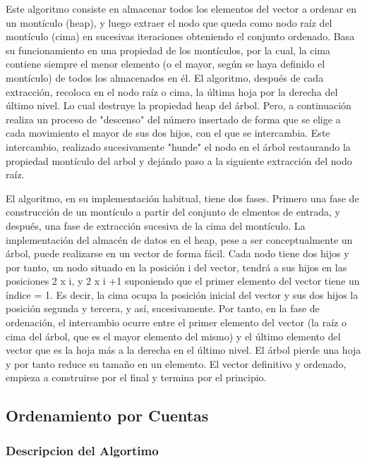 Este algoritmo consiste en almacenar todos los elementos del vector a ordenar en un montículo (heap), y luego extraer el nodo que queda como nodo raíz del montículo (cima) en sucesivas iteraciones obteniendo el conjunto ordenado. Basa su funcionamiento en una propiedad de los montículos, por la cual, la cima contiene siempre el menor elemento (o el mayor, según se haya definido el montículo) de todos los almacenados en él. El algoritmo, después de cada extracción, recoloca en el nodo raíz o cima, la última hoja por la derecha del último nivel. Lo cual destruye la propiedad heap del árbol. Pero, a continuación realiza un proceso de "descenso" del número insertado de forma que se elige a cada movimiento el mayor de sus dos hijos, con el que se intercambia. Este intercambio, realizado sucesivamente "hunde" el nodo en el árbol restaurando la propiedad montículo del arbol y dejándo paso a la siguiente extracción del nodo raíz.

El algoritmo, en su implementación habitual, tiene dos fases. Primero una fase de construcción de un montículo a partir del conjunto de elmentos de entrada, y después, una fase de extracción sucesiva de la cima del montículo. La implementación del almacén de datos en el heap, pese a ser conceptualmente un árbol, puede realizarse en un vector de forma fácil. Cada nodo tiene dos hijos y por tanto, un nodo situado en la posición i del vector, tendrá a sus hijos en las posiciones 2 x i, y 2 x i +1 suponiendo que el primer elemento del vector tiene un índice = 1. Es decir, la cima ocupa la posición inicial del vector y sus dos hijos la posición segunda y tercera, y así, sucesivamente. Por tanto, en la fase de ordenación, el intercambio ocurre entre el primer elemento del vector (la raíz o cima del árbol, que es el mayor elemento del mismo) y el último elemento del vector que es la hoja más a la derecha en el último nivel. El árbol pierde una hoja y por tanto reduce su tamaño en un elemento. El vector definitivo y ordenado, empieza a construirse por el final y termina por el principio.

\subsection{Ordenamiento por Cuentas}

\subsubsection{Descripcion del Algortimo}

